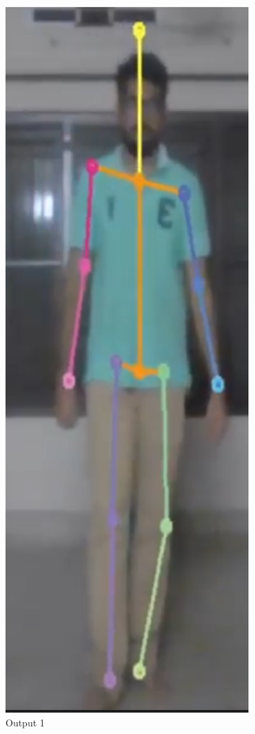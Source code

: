 \documentclass{fisatprojectfinal}
\begin{document}
\begin{figure}[h!]
	\begin{center}
	\includegraphics[scale=0.7]{pose-3}
	\caption{Output 1}
\end{center}
\end{figure}
\end{document}

